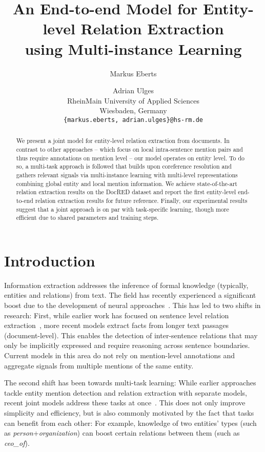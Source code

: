 \documentclass[11pt,a4paper]{article}
\title{An End-to-end Model for Entity-level Relation Extraction \\ using Multi-instance Learning}
\author{Markus Eberts \and Adrian Ulges\\
  RheinMain University of Applied Sciences \\
  Wiesbaden, Germany \\
  \texttt{\{markus.eberts, adrian.ulges\}@hs-rm.de}}
\date{}
\begin{document}
\maketitle
\begin{abstract}
We present a joint model for entity-level relation extraction from documents. In contrast to other approaches -- which focus on local intra-sentence mention pairs and thus require annotations on mention level -- our model operates on entity level. To do so, a multi-task approach is followed that builds upon coreference resolution and gathers relevant signals via multi-instance learning with multi-level representations combining global entity and local mention information. 
We achieve state-of-the-art relation extraction results on the DocRED dataset and report the first entity-level end-to-end relation extraction results for future reference.
Finally, our experimental results suggest that a joint approach is on par with task-specific learning, though more efficient due to shared parameters and training steps.
\end{abstract}

\section{Introduction}
Information extraction addresses the inference of formal knowledge (typically, entities and relations) from text. The field has recently experienced a significant boost due to the development of neural approaches~\cite{zeng:2014:rel_cnn, zhang:2015:rel_pos, kumar:2017:rel_survey}. This has led to two shifts in research: First, while earlier work has focused on sentence level relation extraction~\cite{hendrickx:2010:semeval,han:2018:fewrel,zhang:2017:tacred}, more recent models extract facts from longer text passages (document-level). This enables the detection of inter-sentence relations that may only be implicitly expressed and require reasoning across sentence boundaries. Current models in this area do not rely on mention-level annotations and aggregate signals from multiple mentions of the same entity. 

The second shift has been towards multi-task learning: While earlier approaches tackle entity mention detection and relation extraction with separate models, recent joint models address these tasks at once~\cite{bekoulis:2018:multi_head,nguyen:2019:biaffine_attention,wadden:2019:dygie++}. This does not only improve simplicity and efficiency, but is also commonly motivated by the fact that tasks can benefit from each other: For example, knowledge of two entities' types (such as {\it person}+{\it organization}) can boost certain relations between them (such as {\it ceo\_of}). 
\end{document}
